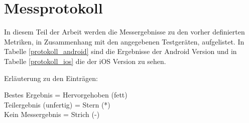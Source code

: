 \section{Messprotokoll}
\label{sec:messprotokol}
In diesem Teil der Arbeit werden die Messergebnisse zu den vorher definierten Metriken, in Zusammenhang mit den angegebenen Testgeräten, aufgelistet. In Tabelle \ref{protokoll_android} sind die Ergebnisse der Android Version und in Tabelle \ref{protokoll_ios} die der iOS Version zu sehen.

\bigskip
Erläuterung zu den Einträgen:

Bestes Ergebnis = Hervorgehoben (fett)\\
Teilergebnis (unfertig) = Stern (*)\\
Kein Messergebnis = Strich (-)

\begin{table}[htbp]
	\centering
\end{table}
